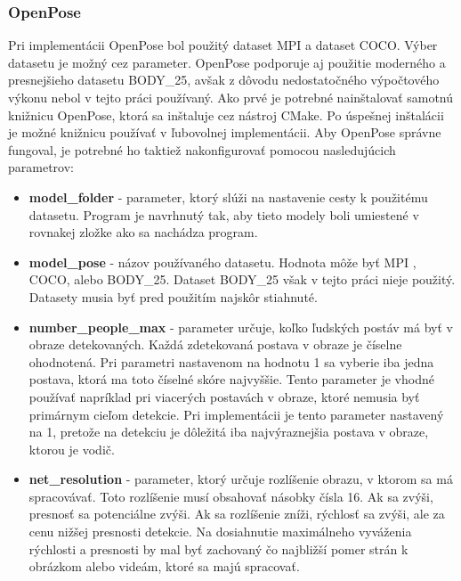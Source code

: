 \documentclass[slovak,master,dept460,male,cpp,cpdeclaration]{diploma}
\begin{document}
\subsubsection*{OpenPose}
 Pri implementácii OpenPose bol použitý dataset MPI a dataset COCO. Výber datasetu je možný cez parameter. OpenPose podporuje aj použitie moderného a presnejšieho datasetu BODY\_25, avšak z dôvodu nedostatočného výpočtového výkonu nebol v tejto práci používaný. Ako prvé je potrebné nainštalovať samotnú knižnicu OpenPose, ktorá sa inštaluje cez  nástroj CMake. Po úspešnej inštalácii je možné  knižnicu používať v ľubovolnej  implementácii. Aby OpenPose správne fungoval, je potrebné ho taktiež nakonfigurovať pomocou nasledujúcich parametrov:
 \begin{itemize}
\item \textbf{model\_folder} - parameter, ktorý slúži na nastavenie cesty k použitému  datasetu. Program je navrhnutý tak, aby  tieto modely boli umiestené v rovnakej zložke ako sa nachádza program. 
\item \textbf{model\_pose} - názov používaného datasetu. Hodnota môže  byť MPI , COCO, alebo BODY\_25. Dataset  BODY\_25 však v tejto práci nieje použitý. Datasety musia byť pred použitím najskôr stiahnuté.
\item \textbf{number\_people\_max} - parameter určuje, koľko ľudských postáv má byť v obraze detekovaných. Každá zdetekovaná postava v obraze je číselne ohodnotená. Pri parametri nastavenom na hodnotu 1 sa vyberie iba jedna postava, ktorá ma toto číselné skóre najvyššie. Tento parameter je vhodné používať napríklad pri viacerých postavách v obraze, ktoré nemusia byť primárnym cieľom detekcie. Pri implementácii je tento parameter nastavený na 1, pretože na detekciu je dôležitá iba najvýraznejšia postava v obraze, ktorou je vodič.
\item \textbf{net\_resolution} - parameter, ktorý určuje rozlíšenie  obrazu, v ktorom sa má spracovávať. Toto rozlíšenie  musí obsahovať násobky čísla 16. Ak sa zvýši, presnosť sa potenciálne zvýši. Ak sa rozlíšenie zníži, rýchlosť sa zvýši, ale za cenu nižšej presnosti detekcie.  Na dosiahnutie maximálneho vyváženia rýchlosti a presnosti by mal byť zachovaný čo najbližší pomer strán k obrázkom alebo videám, ktoré sa majú spracovať.
\end{itemize}
\end{document}
